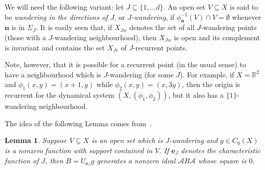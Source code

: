 \documentclass[12pt]{amsart}
\newtheorem{lemma}[theorem]{Lemma}
\theoremstyle{definition}
\newcommand{\mcA}{\mathcal{A}}
\newcommand{\bo}[1]{\mathbf{#1}}
\newcommand{\bom}{\mathbf{m}}
\newcommand{\bon}{\mathbf{n}}
\begin{document}
We will need the following variant: let $J \subseteq \{ 1,\ldots d
\}$. An open set $V\subseteq X$ is said to be \emph{wandering in
the directions of $J$}, or \emph{$J$-wandering}, if
$\phi_{\bon}^{-1}(V)\cap V=\emptyset$ whenever $\bo{n}$ is in $\Sigma_J$.
It is easily seen that, if $X_{Jw}$ denotes the set of all $J$-wandering
points (those with a $J$-wandering neighbourhood), then $X_{Jw}$ is open
and its complement is invariant and contains the set $X_{Jr}$ of
$J$-recurrent points.
\begin{comment}
\footnote{(Delete before
submitting)\emph{Proof. $X_{Jw}$ is open}: obvious

\emph{Its complement is invariant}: Let $x \notin X_{Jw}$ but
suppose, for some $\bom$, that $\phi_\bom(x) \in X_{Jw}$. Then
there exists open $V$ s.t. $\phi_\bom(x) \in V \subseteq X_{Jw}$.
Now $V$ is $J$-wandering hence so is $W \equiv
\phi_{\bom}^{-1}(V)$. Indeed if $\bo{n}$ is in $\Sigma_J$ then
$\phi_{\bon}^{-1}(W)\cap W =
\phi_{\bom}^{-1}(\phi_{\bon}^{-1}(V)\cap V) =\emptyset$. But
$\phi_\bom(x) \in V$ gives $x \in W$ so $x \in X_{Jw}$,
contradiction.

\emph{$X_{Jw}$ contains the set $X_{Jr}$ of $J$-recurrent points}:
If $y \in X_{Jw}$ then there exists $V$ open with $y \in V
\subseteq X_{Jw}$. But if $y \in X_{Jr}$ then there is $(\bon_k)$
$J$-strictly increasing with $\phi_{\bon_k}(y) \to y$, so
$\phi_{\bon_k}(y) \in V$ eventually so $y \in
\phi_{\bon_k}^{-1}(V) \cap V$ with $\bon_k \in \Sigma_J$,
contradiction.}
\end{comment}

Note, however, that it is possible for a recurrent point (in the
usual sense) to have a neighbourhood which is $J$-wandering (for
some $J$). For example, if $X = \mathbb{R}^2$ and
$\phi_1(x,y)=(x+1,y)$ while $\phi_2(x,y)=(x,3y)$, then the origin
is recurrent for the dynamical system $(X, (\phi_1,\phi_2))$, but
it also has a $\{1\}$-wandering neighbourhood.

\medskip

The idea of the following Lemma comes from~\cite[Theorem~4.2]{Muh83}.

\begin{lemma}\label{prad}
Suppose $V\subseteq X$ is an open set which is $J$-wandering and
$g\in C_{0}(X)$ is a nonzero function with support contained in
$V$. If $\bo{e}_J$ denotes the characteristic function of $J$,
then $B=U_{\bo{e}_J} g$ generates a nonzero ideal $\mcA B\mcA$
whose square is $0$.
\end{lemma}
\end{document}

